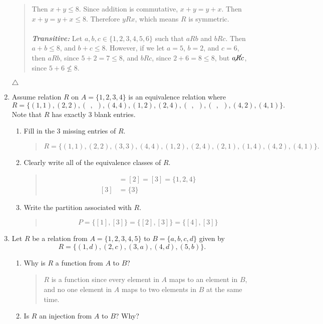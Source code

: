 \documentclass{article}
\begin{document}
\begin{enumerate}
\begin{quote}
Then $x + y \leq 8$.
Since addition is commutative, $x + y = y + x$.
Then $x + y = y + x \leq 8$.
Therefore $yRx$, which means $R$ is symmetric.\\\\
\textit{\textbf{Transitive: }} Let $a,b,c \in  \{1,2,3,4,5,6\}$ such that $aRb$ and $bRc$.
Then $a + b \leq 8$, and $b + c \leq 8$.
However, if we let $a = 5$, $b = 2$, and $c = 6$, then $aRb$, since $5 + 2 = 7 \leq 8$, and $bRc$,
since $2 + 6 = 8 \leq 8$, but $a\cancel{R}c$, since $5 + 6 \nleq 8$.
\end{quote}
$\triangle$
\item Assume relation $R$ on $A = \{1, 2, 3, 4\}$ is an equivalence relation where
\[R = \{(1, 1), (2, 2), (\ \ ,\ \ ), (4, 4), (1, 2), (2, 4), (\ \ ,\ \ ), (\ \ ,\ \ ), (4, 2), (4, 1)\}.\]
Note that $R$ has exactly 3 blank entries.
\begin{enumerate}
\item Fill in the 3 missing entries of $R$.
\begin{quote}
\[R = \{(1, 1), (2, 2), (3, 3), (4, 4), (1, 2), (2, 4), (2, 1), (1, 4), (4, 2), (4, 1)\}.\]
\end{quote}
\item Clearly write all of the equivalence classes of $R$.
\begin{quote}
\begin{align*}
[1] &= [2] = [3] = \{1, 2, 4\}\\
[3] &= \{3\}
\end{align*}
\end{quote}
\item Write the partition associated with $R$.
\begin{quote}
\[P = \{[1],[3]\} = \{[2],[3]\} = \{[4],[3]\}\]
\end{quote}
\end{enumerate}
\item  Let $R$ be a relation from $A=\{1,2,3,4,5\}$ to $B=\{a,b,c,d\}$ given by
\[R=\{(1,d),(2,c),(3,a),(4,d),(5,b)\}.\]
\begin{enumerate}
\item Why is $R$ a function from $A$ to $B$?
\begin{quote}
$R$ is a function since every element in $A$ maps to an element in $B$, and no one element
in $A$ maps to two elements in $B$ at the same time.
\end{quote}
\item Is $R$ an injection from $A$ to $B$? Why?
\begin{quote}

\end{quote}
\end{enumerate}
\end{enumerate}
\end{document}
